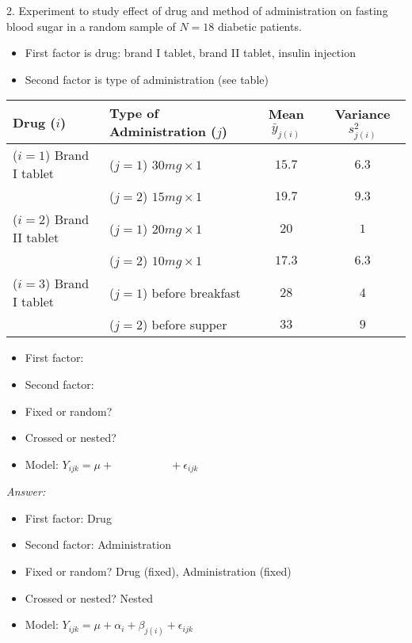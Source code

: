 2.  Experiment to study effect of drug and method of administration on fasting blood sugar in a random sample of $N=18$ diabetic patients.
\begin{itemize}
	\item First factor is drug: brand I tablet, brand II tablet, insulin injection
	\item Second factor is type of administration (see table)
\end{itemize}

\begin{table}[H]
	\renewcommand{\arraystretch}{1.5}
	\centering
	\begin{tabular}{llcc}
		Drug ($i$) & Type of Administration ($j$) & Mean $\bar{y}_{j(i)}$ & Variance $s_{j(i)}^2$\\
		\hline
		($i=1$) Brand I tablet & ($j=1$) $30mg \times 1$ & $15.7$ & $6.3$\\
& ($j=2$) $15mg \times 1$ & $19.7$ & $9.3$\\
		($i=2$) Brand II tablet & ($j=1$) $20mg \times 1$ & $20$ & $1$\\
& ($j=2$) $10mg \times 1$ & $17.3$ & $6.3$\\
		($i=3$) Brand I tablet & ($j=1$) before breakfast & $28$ & $4$\\
& ($j=2$) before supper & $33$ & $9$\\
		\bottomrule
	\end{tabular}
\end{table}

\begin{itemize}
	\item First factor:  
	\item Second factor: 
	\item Fixed or random?  
	\item Crossed or nested?
	\item Model:  $Y_{ijk} = \mu  + \quad \quad \quad \quad \quad  + \epsilon_{ijk}$
\end{itemize}

{\it Answer:}\\
\begin{pf}
	\begin{itemize}
		\item First factor:  Drug
		\item Second factor: Administration
		\item Fixed or random?  Drug (fixed), Administration (fixed)
		\item Crossed or nested?  Nested
		\item Model:  $Y_{ijk} = \mu + \alpha_i + \beta_{j(i)} + \epsilon_{ijk}$
	\end{itemize}
\end{pf}


